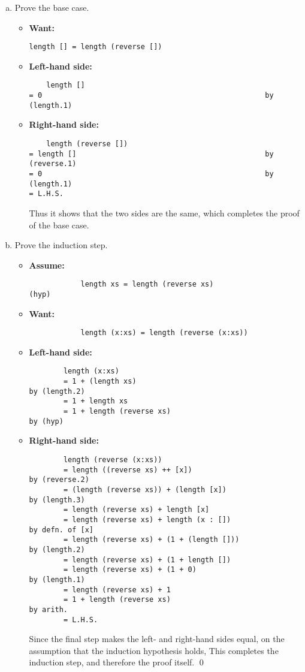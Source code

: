 \documentclass[11pt]{article}
\theoremstyle{definition}
\begin{document}
\begin{enumerate}
\begin{enumerate}[(a)]
\item Prove the base case.
\begin{itemize}
\item \textbf{Want:}
  	\begin{verbatim}
length [] = length (reverse [])
	\end{verbatim}
\item \textbf{Left-hand side:}
	\begin{verbatim}
	length []
= 0                                                    by (length.1)
	\end{verbatim}
\item \textbf{Right-hand side:}
	\begin{verbatim}
	length (reverse [])
= length []                                            by (reverse.1)
= 0                                                    by (length.1)
= L.H.S.  
	\end{verbatim}
	Thus it shows that the two sides are the same, which completes the proof of the base case.
\end{itemize}
\item Prove the induction step.
\begin{itemize}
	\item \textbf{Assume:}
		  \begin{verbatim}
			length xs = length (reverse xs)                                (hyp)
		\end{verbatim}
	\item \textbf{Want:}
		\begin{verbatim}
			length (x:xs) = length (reverse (x:xs))
		\end{verbatim}
	\item \textbf{Left-hand side:}
		\begin{verbatim}
		length (x:xs)
		= 1 + (length xs)                                       by (length.2)
		= 1 + length xs
		= 1 + length (reverse xs)                                    by (hyp)
		\end{verbatim}
	\item \textbf{Right-hand side:}
		\begin{verbatim}
		length (reverse (x:xs))
		= length ((reverse xs) ++ [x])                          by (reverse.2)
		= (length (reverse xs)) + (length [x])                  by (length.3)
		= length (reverse xs) + length [x]
		= length (reverse xs) + length (x : [])                 by defn. of [x]
		= length (reverse xs) + (1 + (length []))               by (length.2)
		= length (reverse xs) + (1 + length [])
		= length (reverse xs) + (1 + 0)                         by (length.1)
		= length (reverse xs) + 1
		= 1 + length (reverse xs)					                                   by arith.
		= L.H.S.
		\end{verbatim}
		Since the final step makes the left- and right-hand sides equal, on the assumption that the induction hypothesis holds, This completes the induction step, and therefore the proof itself. \qed
	\end{itemize}
\end{enumerate}

\end{enumerate}
\end{document}
